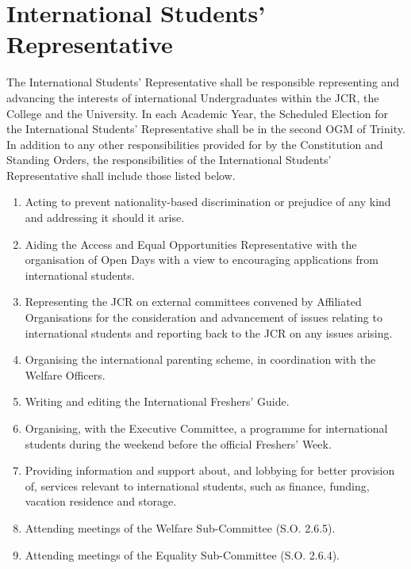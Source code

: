 \section{International Students' Representative}
\npara The International Students' Representative shall be responsible representing and advancing the interests of international Undergraduates within the JCR, the College and the University.
\npara In each Academic Year, the Scheduled Election for the International Students' Representative shall be in the second OGM of Trinity.
\npara In addition to any other responsibilities provided for by the Constitution and Standing Orders, the responsibilities of the International Students' Representative shall include those listed below.
\begin{enumerate}
	\item Acting to prevent nationality-based discrimination or prejudice of any kind and addressing it should it arise.
	\item Aiding the Access and Equal Opportunities Representative with the organisation of Open Days with a view to encouraging applications from international students.
	\item Representing the JCR on external committees convened by Affiliated Organisations for the consideration and advancement of issues relating to international students and reporting back to the JCR on any issues arising.
	\item Organising the international parenting scheme, in coordination with the Welfare Officers.
	\item Writing and editing the International Freshers' Guide.
	\item Organising, with the Executive Committee, a programme for international students during the weekend before the official Freshers' Week.
	\item Providing information and support about, and lobbying for better provision of, services relevant to international students, such as finance, funding, vacation residence and storage.
	\item Attending meetings of the Welfare Sub-Committee (S.O. 2.6.5).
	\item Attending meetings of the Equality Sub-Committee (S.O. 2.6.4).
\end{enumerate}
